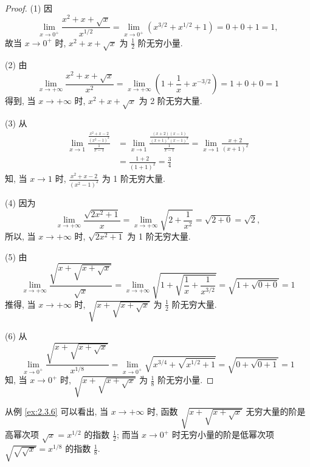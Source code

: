 \begin{proof}
(1) 因
\[
\lim_{x\to0^+}\frac{x^2+x+\sqrt{x}}{x^{1/2}} = \lim_{x\to0^+}(x^{3/2} + x^{1/2} + 1) = 0 + 0 + 1 = 1,
\]
故当 $x \to 0^+$ 时, $x^2 + x + \sqrt{x}$ 为 $\frac{1}{2}$ 阶无穷小量.

(2) 由
\[
\lim_{x\to+\infty}\frac{x^2+x+\sqrt{x}}{x^2} = \lim_{x\to+\infty}\left(1 + \frac{1}{x} + x^{-3/2}\right) = 1 + 0 + 0 = 1
\]
得到, 当 $x \to +\infty$ 时, $x^2 + x + \sqrt{x}$ 为 2 阶无穷大量.

(3) 从
\[
\begin{aligned}
\lim_{x\to1}\frac{\frac{x^2+x-2}{(x^2-1)^2}}{\frac{1}{x-1}} &= \lim_{x\to1}\frac{\frac{(x+2)(x-1)}{(x+1)^2(x-1)^2}}{\frac{1}{x-1}} = \lim_{x\to1}\frac{x+2}{(x+1)^2} \\
&= \frac{1+2}{(1+1)^2} = \frac{3}{4}
\end{aligned}
\]
知, 当 $x \to 1$ 时, $\frac{x^2+x-2}{(x^2-1)^2}$ 为 1 阶无穷大量.

(4) 因为
\[
\lim_{x\to+\infty}\frac{\sqrt{2x^2+1}}{x} = \lim_{x\to+\infty}\sqrt{2 + \frac{1}{x^2}} = \sqrt{2+0} = \sqrt{2},
\]
所以, 当 $x \to +\infty$ 时, $\sqrt{2x^2+1}$ 为 1 阶无穷大量.

(5) 由
\[
\lim_{x\to+\infty}\frac{\sqrt{x+\sqrt{x+\sqrt{x}}}}{\sqrt{x}} = \lim_{x\to+\infty}\sqrt{1 + \sqrt{\frac{1}{x} + \frac{1}{x^{3/2}}}} = \sqrt{1 + \sqrt{0+0}} = 1
\]
推得, 当 $x \to +\infty$ 时, $\sqrt{x + \sqrt{x + \sqrt{x}}}$ 为 $\frac{1}{2}$ 阶无穷大量.

(6) 从
\[
\lim_{x\to0^+}\frac{\sqrt{x+\sqrt{x+\sqrt{x}}}}{x^{1/8}} = \lim_{x\to0^+}\sqrt{x^{3/4} + \sqrt{x^{1/2} + 1}} = \sqrt{0 + \sqrt{0+1}} = 1
\]
知, 当 $x \to 0^+$ 时, $\sqrt{x + \sqrt{x + \sqrt{x}}}$ 为 $\frac{1}{8}$ 阶无穷小量.
\end{proof}

\begin{remark}\label{rem:2.3.1}
从例 \ref{ex:2.3.6} 可以看出, 当 $x \to +\infty$ 时, 函数 $\sqrt{x + \sqrt{x + \sqrt{x}}}$ 无穷大量的阶是高幂次项 $\sqrt{x} = x^{1/2}$ 的指数 $\frac{1}{2}$; 而当 $x \to 0^+$ 时无穷小量的阶是低幂次项 $\sqrt{\sqrt{\sqrt{x}}} = x^{1/8}$ 的指数 $\frac{1}{8}$.
\end{remark}

